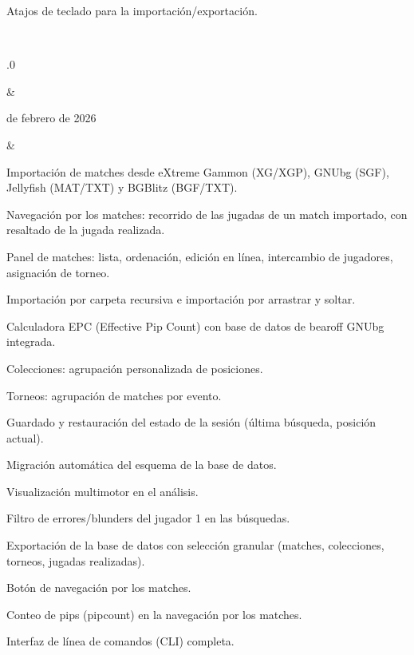 \documentclass[letterpaper,10pt,spanish]{sphinxmanual}
\begin{document}
\begin{savenotes}
\begin{longtable}{}
\begin{varwidth}[t]{}
\sphinxAtStartPar
Atajos de teclado para la importación/exportación.
\sphinxbeforeendvarwidth
\end{varwidth}%
\\
\sphinxhline\begin{varwidth}[t]{}
.0
\sphinxbeforeendvarwidth
\end{varwidth}%
&\begin{varwidth}[t]{}
 de febrero de 2026
\sphinxbeforeendvarwidth
\end{varwidth}%
&\begin{varwidth}[t]{}
\sphinxAtStartPar
Importación de matches desde eXtreme Gammon (XG/XGP), GNUbg (SGF), Jellyfish (MAT/TXT) y BGBlitz (BGF/TXT).

\sphinxAtStartPar
Navegación por los matches: recorrido de las jugadas de un match importado, con resaltado de la jugada realizada.

\sphinxAtStartPar
Panel de matches: lista, ordenación, edición en línea, intercambio de jugadores, asignación de torneo.

\sphinxAtStartPar
Importación por carpeta recursiva e importación por arrastrar y soltar.

\sphinxAtStartPar
Calculadora EPC (Effective Pip Count) con base de datos de bearoff GNUbg integrada.

\sphinxAtStartPar
Colecciones: agrupación personalizada de posiciones.

\sphinxAtStartPar
Torneos: agrupación de matches por evento.

\sphinxAtStartPar
Guardado y restauración del estado de la sesión (última búsqueda, posición actual).

\sphinxAtStartPar
Migración automática del esquema de la base de datos.

\sphinxAtStartPar
Visualización multimotor en el análisis.

\sphinxAtStartPar
Filtro de errores/blunders del jugador 1 en las búsquedas.

\sphinxAtStartPar
Exportación de la base de datos con selección granular (matches, colecciones, torneos, jugadas realizadas).

\sphinxAtStartPar
Botón de navegación por los matches.

\sphinxAtStartPar
Conteo de pips (pipcount) en la navegación por los matches.

\sphinxAtStartPar
Interfaz de línea de comandos (CLI) completa.


\end{varwidth}
\end{longtable}
\end{savenotes}
\end{document}
